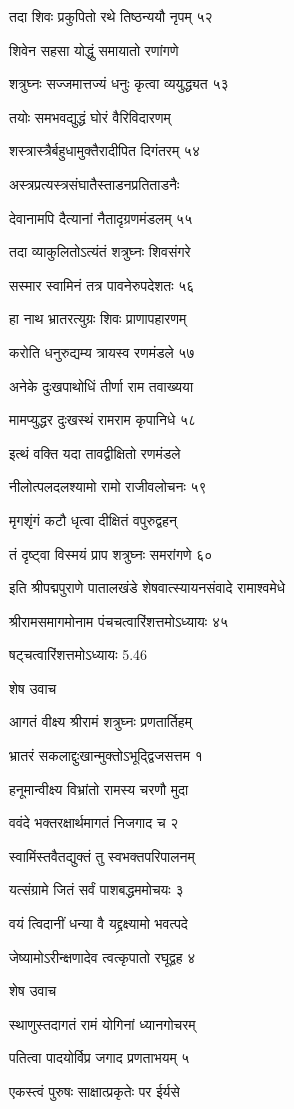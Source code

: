 तदा शिवः प्रकुपितो रथे तिष्ठन्ययौ नृपम् ५२

शिवेन सहसा योद्धुं समायातो रणांगणे

शत्रुघ्नः सज्जमात्तज्यं धनुः कृत्वा व्ययुद्ध्यत ५३

तयोः समभवद्युद्धं घोरं वैरिविदारणम्

शस्त्रास्त्रैर्बहुधामुक्तैरादीपित दिगंतरम् ५४

अस्त्रप्रत्यस्त्रसंघातैस्ताडनप्रतिताडनैः

देवानामपि दैत्यानां नैतादृग्रणमंडलम् ५५

तदा व्याकुलितोऽत्यंतं शत्रुघ्नः शिवसंगरे

सस्मार स्वामिनं तत्र पावनेरुपदेशतः ५६

हा नाथ भ्रातरत्युग्रः शिवः प्राणापहारणम्

करोति धनुरुद्यम्य त्रायस्व रणमंडले ५७

अनेके दुःखपाथोधिं तीर्णा राम तवाख्यया

मामप्युद्धर दुःखस्थं रामराम कृपानिधे ५८

इत्थं वक्ति यदा तावद्वीक्षितो रणमंडले

नीलोत्पलदलश्यामो रामो राजीवलोचनः ५९

मृगशृंगं कटौ धृत्वा दीक्षितं वपुरुद्वहन्

तं दृष्ट्वा विस्मयं प्राप शत्रुघ्नः समरांगणे ६०

इति श्रीपद्मपुराणे पातालखंडे शेषवात्स्यायनसंवादे रामाश्वमेधे

श्रीरामसमागमोनाम पंचचत्वारिंशत्तमोऽध्यायः ४५

षट्चत्वारिंशत्तमोऽध्यायः 5.46

शेष उवाच

आगतं वीक्ष्य श्रीरामं शत्रुघ्नः प्रणतार्तिहम्

भ्रातरं सकलाद्दुःखान्मुक्तोऽभूद्द्विजसत्तम १

हनूमान्वीक्ष्य विभ्रांतो रामस्य चरणौ मुदा

ववंदे भक्तरक्षार्थमागतं निजगाद च २

स्वामिंस्तवैतद्युक्तं तु स्वभक्तपरिपालनम्

यत्संग्रामे जितं सर्वं पाशबद्धममोचयः ३

वयं त्विदानीं धन्या वै यद्द्रक्ष्यामो भवत्पदे

जेष्यामोऽरीन्क्षणादेव त्वत्कृपातो रघूद्वह ४

शेष उवाच

स्थाणुस्तदागतं रामं योगिनां ध्यानगोचरम्

पतित्वा पादयोर्विप्र जगाद प्रणताभयम् ५

एकस्त्वं पुरुषः साक्षात्प्रकृतेः पर ईर्यसे

